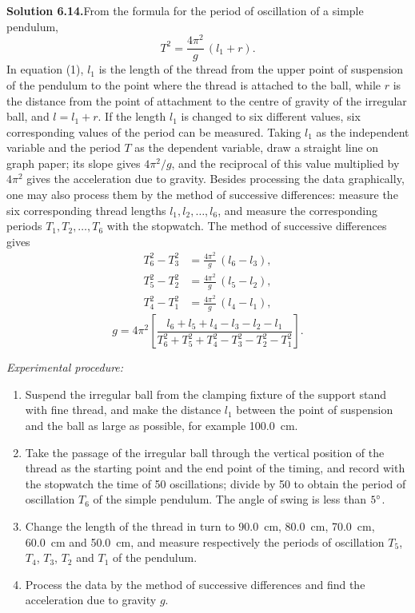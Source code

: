\medskip
\noindent\textbf{Solution 6.14.}\quad From the formula for the period of oscillation of a simple pendulum,
\begin{equation}\tag{1}
T^{2}=\frac{4\pi^{2}}{g}\,(l_1+r).
\end{equation}
In equation (1), $l_1$ is the length of the thread from the upper point of suspension of the pendulum to the point where the thread is attached to the ball, while $r$ is the distance from the point of attachment to the centre of gravity of the irregular ball, and $l=l_1+r$. If the length $l_1$ is changed to six different values, six corresponding values of the period can be measured. Taking $l_1$ as the independent variable and the period $T$ as the dependent variable, draw a straight line on graph paper; its slope gives $4\pi^{2}/g$, and the reciprocal of this value multiplied by $4\pi^{2}$ gives the acceleration due to gravity. Besides processing the data graphically, one may also process them by the method of successive differences: measure the six corresponding thread lengths $l_1,l_2,\dots,l_6$, and measure the corresponding periods $T_1,T_2,\dots,T_6$ with the stopwatch. The method of successive differences gives
\begin{align*}
T_6^{2}-T_3^{2}&=\frac{4\pi^{2}}{g}\,(l_6-l_3),\\[2pt]
T_5^{2}-T_2^{2}&=\frac{4\pi^{2}}{g}\,(l_5-l_2),\\[2pt]
T_4^{2}-T_1^{2}&=\frac{4\pi^{2}}{g}\,(l_4-l_1),
\end{align*}
\begin{equation*}
g=4\pi^{2}\left[\frac{l_6+l_5+l_4-l_3-l_2-l_1}
{T_6^{2}+T_5^{2}+T_4^{2}-T_3^{2}-T_2^{2}-T_1^{2}}\right].
\end{equation*}

\noindent\textit{Experimental procedure:}
\begin{enumerate}[label=(\arabic*),leftmargin=2.2em,itemsep=1pt,topsep=2pt]
\item Suspend the irregular ball from the clamping fixture of the support stand with fine thread, and make the distance $l_1$ between the point of suspension and the ball as large as possible, for example \SI{100.0}{cm}.
\item Take the passage of the irregular ball through the vertical position of the thread as the starting point and the end point of the timing, and record with the stopwatch the time of 50 oscillations; divide by 50 to obtain the period of oscillation $T_6$ of the simple pendulum. The angle of swing is less than $5^{\circ}$.
\item Change the length of the thread in turn to \SI{90.0}{cm}, \SI{80.0}{cm}, \SI{70.0}{cm}, \SI{60.0}{cm} and \SI{50.0}{cm}, and measure respectively the periods of oscillation $T_5$, $T_4$, $T_3$, $T_2$ and $T_1$ of the pendulum.
\item Process the data by the method of successive differences and find the acceleration due to gravity $g$.
\end{enumerate}

